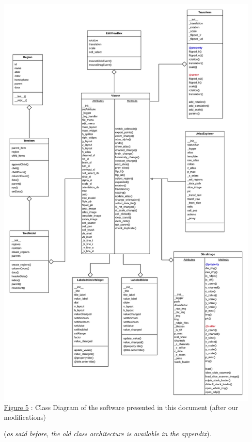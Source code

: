 \documentclass[a4paper,12pt]{report}
\begin{document}
\begin{center} \includegraphics[scale=0.23]{newClasses.png} \\ 
\underline{Figure 5} : Class Diagram of the software presented in this document (after our modifications)

(\textit{as said before, the old class architecture is available in the appendix}).\\ \vspace{1\baselineskip} \end{center}
\end{document}
